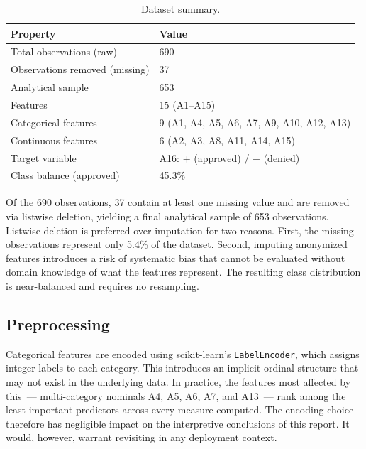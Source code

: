 \documentclass[11pt]{article}
\newcommand{\rowhead}{\rowcolor{NavyReport!15}}
\newcommand{\rowalt}{\rowcolor{LightGray}}
\begin{document}
\begin{table}[H]
\centering
\caption{Dataset summary.}
\label{tab:dataset}
\setlength{\arrayrulewidth}{0.4pt}
\begin{tabular}{ll}
\toprule
\rowhead
\color{white}\textbf{Property} & \color{white}\textbf{Value} \\
\midrule
Total observations (raw)       & 690 \\
\rowalt
Observations removed (missing) & 37 \\
Analytical sample              & 653 \\
\rowalt
Features                       & 15 (A1--A15) \\
Categorical features           & 9 (A1, A4, A5, A6, A7, A9, A10, A12, A13) \\
\rowalt
Continuous features            & 6 (A2, A3, A8, A11, A14, A15) \\
Target variable                & A16: + (approved) / $-$ (denied) \\
\rowalt
Class balance (approved)       & 45.3\% \\
\bottomrule
\end{tabular}
\end{table}

Of the 690 observations, 37 contain at least one missing value and are removed via listwise deletion, yielding a final analytical sample of 653 observations. Listwise deletion is preferred over imputation for two reasons. First, the missing observations represent only 5.4\% of the dataset. Second, imputing anonymized features introduces a risk of systematic bias that cannot be evaluated without domain knowledge of what the features represent. The resulting class distribution is near-balanced and requires no resampling.

\subsection{Preprocessing}

Categorical features are encoded using scikit-learn's \texttt{LabelEncoder}, which assigns integer labels to each category. This introduces an implicit ordinal structure that may not exist in the underlying data. In practice, the features most affected by this~--- multi-category nominals A4, A5, A6, A7, and A13~--- rank among the least important predictors across every measure computed. The encoding choice therefore has negligible impact on the interpretive conclusions of this report. It would, however, warrant revisiting in any deployment context.
\end{document}
